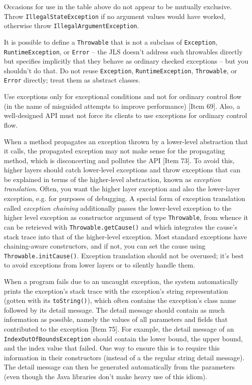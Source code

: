 \documentclass[8pt, table, xcdraw]{article}%
\begin{document}
Occasions for use in the table above do not appear to be mutually exclusive. Throw \lstinline{IllegalStateException} if no argument values would have worked, otherwise throw \lstinline{IllegalArgumentException}.

It is possible to define a \lstinline{Throwable} that is not a subclass of \lstinline{Exception}, \lstinline{RuntimeException}, or \lstinline{Error} -- the JLS doesn’t address such throwables directly but specifies implicitly that they behave as ordinary checked exceptions -- but you shouldn't do that. Do not reuse \lstinline{Exception}, \lstinline{RuntimeException}, \lstinline{Throwable}, or \lstinline{Error} directly; treat them as abstract classes.

Use exceptions only for exceptional conditions and not for ordinary control flow (in the name of misguided attempts to improve performance) [Item 69]. Also, a well-designed API must not force its clients to use exceptions for ordinary control flow.

When a method propagates an exception thrown by a lower-level abstraction that it calls, the propagated exception may not make sense for the propagating method, which is disconcerting and pollutes the API [Item 73]. To avoid this, higher layers should catch lower-level exceptions and throw exceptions that can be explained in terms of the higher-level abstraction, known as \emph{exception translation}. Often, you want the higher layer exception and also the lower-layer exception, e.g. for purposes of debugging. A special form of exception translation called \emph{exception chaining} additionally passes the lower-level exception to the higher level exception as constructor argument of type \lstinline{Throwable}, from whence it can be retrieved with \lstinline{Throwable.getCause()} and which integrates the cause’s stack trace into that of the higher-level exception. Most standard exceptions have chaining-aware constructors, and if not, you can set the cause using \lstinline{Throwable.initCause()}. Exception translation should not be overused; it's best to avoid exceptions from lower layers or to silently handle them.

When a program fails due to an uncaught exception, the system automatically prints the exception’s stack trace with the exception’s string
representation (gotten with its \lstinline{toString()}), which often contains the exception’s class name followed by its detail message. The detail message should contain as much information as possible, namely the values of all parameters and fields that contributed to the exception [Item 75]. For example, the detail message of an \lstinline{IndexOutOfBoundsException} should contain the lower bound, the upper bound, and the index value that failed. One way to ensure this is to require this information in their constructors (instead of a the regular string detail message). The detail message can then be generated automatically from the parameters (even though the Java libraries don’t make heavy use of this idiom).
\end{document}
